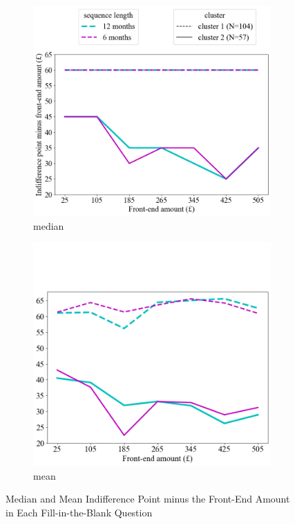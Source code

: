\documentclass[
  12pt,
]{article}
\begin{document}
\begin{figure}
    \centering
    \begin{subfigure}{0.51\textwidth}
        \centering
        \includegraphics[width=\linewidth]{figures/cluster_result_median.png} 
        \caption{median}
    \end{subfigure}
    \hfill
    \begin{subfigure}{0.48\textwidth}
        \centering
        \includegraphics[width=\linewidth]{figures/cluster_result_mean.png}
        \caption{mean}
    \end{subfigure}
    \caption{Median and Mean Indifference Point minus the Front-End Amount in Each Fill-in-the-Blank Question}
    \label{fig:cluster_result}
\end{figure}
\end{document}
